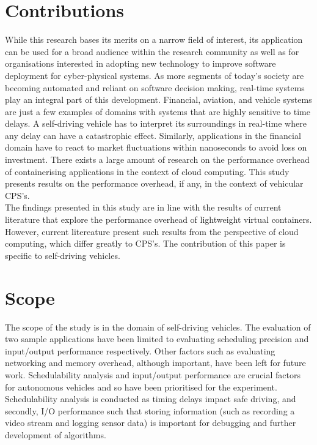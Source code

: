 \section{Contributions}

While this research bases its merits on a narrow field of interest, its application can be used for a broad audience within the research community as well as for organisations interested in adopting new technology to improve software deployment for cyber-physical systems. As more segments of today’s society are becoming automated and reliant on software decision making, real-time systems play an integral part of this development. Financial, aviation, and vehicle systems are just a few examples of domains with systems that are highly sensitive to time delays. A self-driving vehicle has to interpret its surroundings in real-time where any delay can have a catastrophic effect. Similarly, applications in the financial domain have to react to market fluctuations within nanoseconds to avoid loss on investment. There exists a large amount of research on the performance overhead of containerising applications in the context of cloud computing. This study presents results on the performance overhead, if any, in the context of vehicular CPS's. \\

The findings presented in this study are in line with the results of current literature that explore the performance overhead of lightweight virtual containers. However, current litereature present such results from the perspective of cloud computing, which differ greatly to CPS's. The contribution of this paper is specific to self-driving vehicles.

\section{Scope}
The scope of the study is in the domain of self-driving vehicles. The evaluation of two sample applications have been limited to evaluating scheduling precision and input/output performance respectively. Other factors such as evaluating networking and memory overhead, although important, have been left for future work. Schedulability analysis and input/output performance are crucial factors for autonomous vehicles and so have been prioritised for the experiment. Schedulability analysis is conducted as timing delays impact safe driving, and secondly, I/O performance such that storing information (such as recording a video stream and logging sensor data) is important for debugging and further development of algorithms. 

